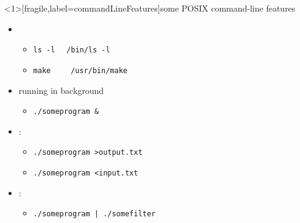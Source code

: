 \begin{frame}<1>[fragile,label=commandLineFeatures]{some POSIX command-line features}
\begin{itemize}
\item {}
    \begin{itemize}
    \item \verb|ls -l|  \textrightarrow \ \ \verb|/bin/ls -l|
    \item \verb|make| \ \ \textrightarrow \ \ \verb|/usr/bin/make|
    \end{itemize}
\item running in background
    \begin{itemize}
    \item \verb|./someprogram &|
    \end{itemize}
\item {}:
    \begin{itemize}
    \item \verb|./someprogram >output.txt|
    \item \verb|./someprogram <input.txt|
    \end{itemize}
\item {}:
    \begin{itemize}
    \item \verb!./someprogram | ./somefilter!
    \end{itemize}
\end{itemize}
\end{frame}


